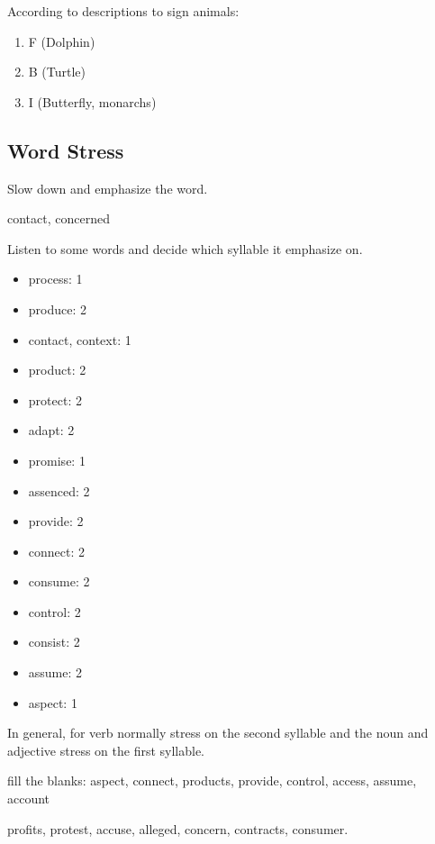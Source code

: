 \begin{notation}
    According to descriptions to sign animals:
    \begin{enumerate}
        \item F (Dolphin)
        \item B (Turtle)
        \item I (Butterfly, monarchs)
    \end{enumerate}
\end{notation}
\subsection{Word Stress}%
\label{sub:Word Stress}
Slow down and emphasize the word.
\begin{eg}
    contact, concerned
\end{eg}
\begin{eg}
    Listen to some words and decide which syllable it emphasize on.
    \begin{itemize}
        \item process: 1
        \item produce: 2
        \item contact, context: 1
        \item product: 2
        \item protect: 2
        \item adapt: 2
        \item promise: 1
        \item assenced: 2
        \item provide: 2
        \item connect: 2
        \item consume: 2
        \item control: 2
        \item consist: 2
        \item assume: 2
        \item aspect: 1
    \end{itemize}
\end{eg}
In general, for verb normally stress on the second syllable and the noun and adjective stress on the first syllable.
\begin{eg}
    fill the blanks:
    aspect, connect, products, provide, control, access, assume, account
\end{eg}
\begin{eg}
    profits, protest, accuse, alleged, concern, contracts, consumer.
\end{eg}
